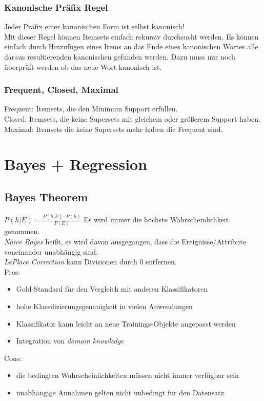 \documentclass[a4paper]{scrartcl}
\begin{document}
\subsubsection{Kanonische Präfix Regel}
Jeder Präfix einer kanonischen Form ist selbst kanonisch!\\
Mit dieser Regel können Itemsets einfach rekursiv durchsucht werden. Es können einfach durch Hinzufügen eines Items an das Ende eines kanonischen Wortes alle daraus resultierenden kanonischen gefunden werden. Dazu muss nur noch überprüft werden ob das neue Wort kanonisch ist.

\subsubsection{Frequent, Closed, Maximal}
Frequent: Itemsets, die den Minimum Support erfüllen.\\
Closed: Itemsets, die keine Supersets mit gleichem oder größerem Support haben.\\
Maximal: Itemsets die keine Supersets mehr haben die Frequent sind.\\

\section{Bayes + Regression}
\subsection{Bayes Theorem}
$P(h|E)=\frac{P(h|E)\cdot P(h)}{P(E)} $
Es wird immer die höchste Wahrscheinlichkeit genommen.\\
\textit{Naive Bayes} heißt, es wird davon ausgegangen, dass die Ereignisse/Attribute voneinander unabhängig sind.\\
\textit{LaPlace Correction} kann Divisionen durch 0 entfernen.\\
Pros:
\begin{itemize}
\item Gold-Standard für den Vergleich mit anderen Klassifikatoren
\item hohe Klassifizierungsgenauigkeit in vielen Anwendungen
\item Klassifikator kann leicht an neue Trainings-Objekte angepasst werden
\item Integration von \textit{domain knowledge}
\end{itemize}
Cons:
\begin{itemize}
\item die bedingten Wahrscheinlichkeiten müssen nicht immer verfügbar sein
\item unabhängige Annahmen gelten nicht unbedingt für den Datensatz
\end{itemize}
\end{document}
